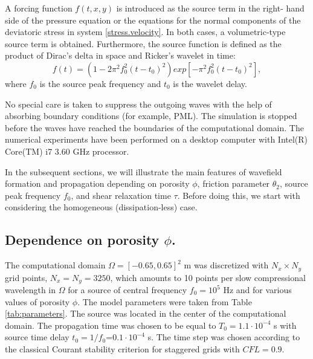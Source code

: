 \documentclass[3p,times,table]{article}
\begin{document}
A forcing function $f(t,x,y)$ is introduced as the source term in the right- 
hand side of the pressure equation or the equations for the normal components 
of 
the deviatoric stress in system \eqref{stress.velocity}. In both cases, a 
volumetric-type source term is obtained. Furthermore, the source function is 
defined as the product of Dirac's delta in space and Ricker's wavelet in time: 
\begin{equation}
f(t)=(1-2\pi ^{2} f_{0}^{2}(t-t_{0})^{2})exp[-\pi ^{2}f_{0}^{2}(t-t_{0})^{2}],
\end{equation}
where $f_{0}$ is the source peak frequency and $t_{0}$ is the wavelet delay.

No special care is taken to suppress the  outgoing waves with the help of absorbing boundary conditions (for example, PML). The simulation is stopped before the waves have reached the boundaries of the computational domain. 
The numerical experiments have been performed on a desktop computer with Intel(R) 
Core(TM) i7 3.60 GHz processor.

In the subsequent sections, we  will illustrate the main features of  
wavefield formation and propagation depending on porosity $\phi$, 
friction parameter $\theta_2$, source peak frequency $f_{0}$, and  shear relaxation time $\tau$. Before doing 
this, we start with considering the homogeneous (dissipation-less) case.

\subsection{Dependence on  porosity $\phi$.}

The computational domain $\Omega =[-0.65, 0.65]^{2}$  m was discretized with 
$ N_x \times N_y$ grid points, $N_x = N_y = 3250$, which amounts to 10 points 
per 
slow 
compressional wavelength in $\Omega$ for a source of central frequency 
$f_0=10^{5} $ Hz  and for various values of porosity $\phi$. The model 
parameters were taken from Table\,\ref{tab:parameters}. The source was located 
in the center of the computational 
domain. The propagation time was chosen to be equal to $T_{0}= 1.1\cdot10^{-4}$ s  with 
 source time delay $t_{0}=1/f_{0}$=$ 0.1\cdot10^{-4}$ s. 
The time step was chosen according to 
the classical Courant stability criterion for staggered grids with $CFL = 0.9$. 
\end{document}
